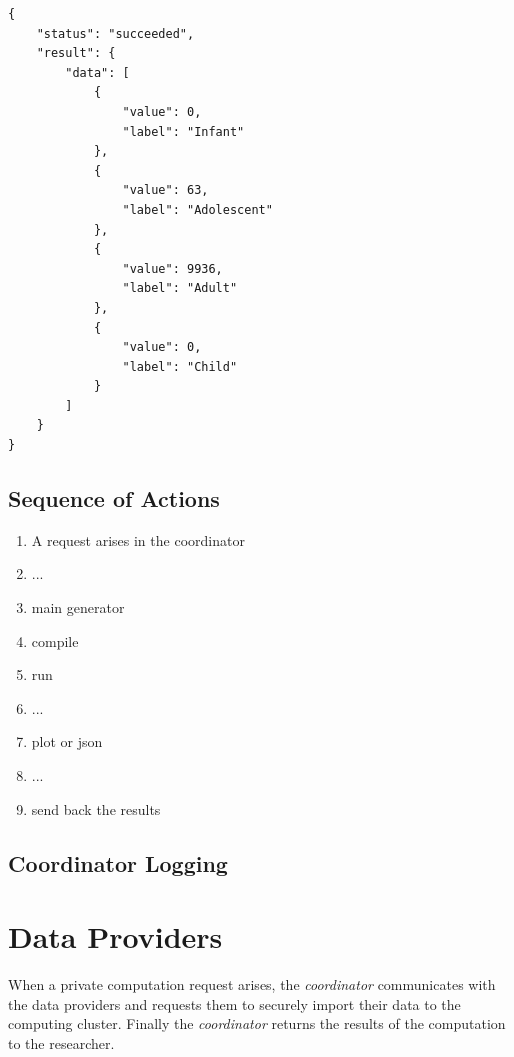 \begin{itemize}
{
\begin{verbatim}
{
    "status": "succeeded",
    "result": {
        "data": [
            {
                "value": 0,
                "label": "Infant"
            },
            {
                "value": 63,
                "label": "Adolescent"
            },
            {
                "value": 9936,
                "label": "Adult"
            },
            {
                "value": 0,
                "label": "Child"
            }
        ]
    }
}
\end{verbatim}
\label{sc:get-response}
}

\end{itemize}



\subsection{Sequence of Actions}\label{ss:coordinator-sequence}


\begin{enumerate}
\item A request arises in the coordinator
\item ...
\item main generator
\item compile
\item run
\item ...
\item plot or json
\item ...
\item send back the results
\end{enumerate}


\subsection{Coordinator Logging}\label{ss:coordinator-logging}




\section{Data Providers}\label{s:impl-data-providers}
When a private computation request arises, the \textit{coordinator} communicates with the data providers and requests them to securely import their data to the computing cluster.
Finally the \textit{coordinator} returns the results of the computation to the researcher.

